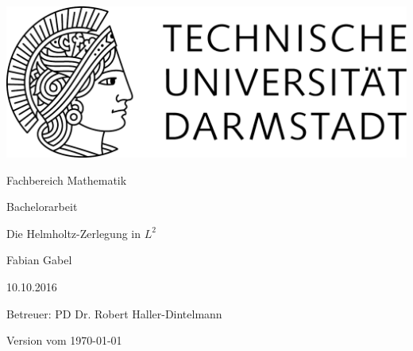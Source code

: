 \begin{titlepage}
  \begin{center}
    \vspace{1cm}
    \includegraphics[width=0.5\linewidth]{TU_Darmstadt_Logo.pdf}
    \vspace{1cm}
    
    \large{Fachbereich Mathematik}
    \vspace{2.5cm}
    
    \large{Bachelorarbeit}
    \vspace{2cm}

    \huge{Die Helmholtz-Zerlegung in $L^2$}
    
    \vspace*{3cm}    
    
		\large
                Fabian Gabel
    \vspace*{1.0cm}

    10.10.2016 \\
    \vspace*{2cm}

    Betreuer: PD Dr. Robert Haller-Dintelmann

    \vspace*{.5cm}

    \vspace*{\fill}
    \tiny{Version vom \today}
  \end{center}
\end{titlepage}
\vspace*{\fill}
